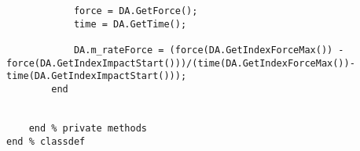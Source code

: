 \begin{lstlisting}
            force = DA.GetForce();
            time = DA.GetTime();
            
            DA.m_rateForce = (force(DA.GetIndexForceMax()) - force(DA.GetIndexImpactStart()))/(time(DA.GetIndexForceMax())-time(DA.GetIndexImpactStart()));
        end
            
            
    end % private methods
end % classdef
\end{lstlisting}
